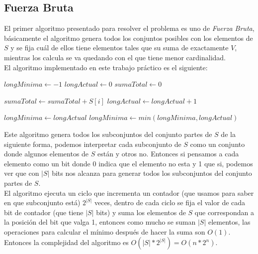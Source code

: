 \documentclass[a4paper]{article}
\begin{document}
\subsection{Fuerza Bruta}
El primer algoritmo presentado para resolver el problema es uno de \textit{Fuerza Bruta}, b\'asicamente el algoritmo genera todos los conjuntos posibles con los elementos de $S$ y se fija cu\'al de ellos tiene elementos tales que su suma de exactamente $V$, mientras los calcula se va quedando con el que tiene menor cardinalidad.
\\
El algoritmo implementado en este trabajo práctico es el siguiente:
\\
\begin{algorithm}
\begin{algorithmic}
		\State $longMinima \gets -1$
			\State $longActual \gets 0$
			\State $sumaTotal \gets 0$
				
			 
					\State $sumaTotal \gets sumaTotal + S[i]$
					\State $longActual \gets longActual + 1$
				\EndIf
			\EndFor
			
					\State $longMinima \gets longActual$
				\Else
					\State $longMinima \gets min(longMinima, longActual)$
				\EndIf
			\EndIf
		\EndFor
		
	\EndProcedure
\end{algorithmic}
\end{algorithm}

Este algoritmo genera todos los subconjuntos del conjunto partes de $S$ de la siguiente forma, podemos interpretar cada subconjunto de $S$ como un conjunto donde algunos elementos de $S$ están y otros no. Entonces si pensamos a cada elemento como un bit donde 0 indica que el elemento no esta y 1 que si, podemos ver que con $|S|$ bits nos alcanza para generar todos los subconjuntos del conjunto partes de $S$.
\\
El algoritmo ejecuta un ciclo que incrementa un contador (que usamos para saber en que subconjunto está) $2^{|S|}$ veces, dentro de cada ciclo se fija el valor de cada bit de contador (que tiene $|S|$ bits) y suma los elementos de $S$ que correspondan a la posición del bit que valga 1, entonces como mucho se suman $|S|$ elementos, las operaciones para calcular el m\'inimo despu\'es de hacer la suma son $O(1)$.
\\
Entonces la complejidad del algoritmo es $O(|S| * 2^|S|) = O(n * 2^n)$.
\end{document}
